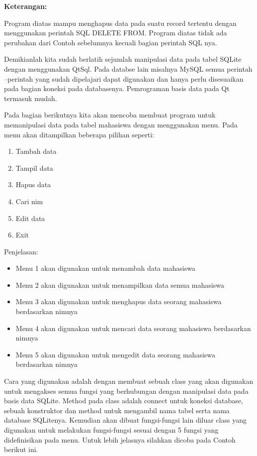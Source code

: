 \textbf{Keterangan:}

Program diatas mampu menghapus data pada suatu record tertentu dengan
menggunakan perintah SQL DELETE FROM. Program diatas tidak ada perubahan
dari Contoh sebelumnya kecuali bagian perintah SQL nya.

Demikianlah kita sudah berlatih sejumlah manipulasi data pada tabel
SQLite dengan menggunakan QtSql. Pada databse lain misalnya MySQL semua
perintah --perintah yang sudah dipelajari dapat digunakan dan hanya
perlu disesuaikan pada bagian koneksi pada databasenya. Pemrograman
basis data pada Qt termasuk mudah.

Pada bagian berikutnya kita akan mencoba membuat program untuk
memanipulasi data pada tabel mahasiswa dengan menggunakan menu. Pada
menu akan ditampilkan beberapa pilihan seperti:

\begin{enumerate}


\item
Tambah data
\item
Tampil data
\item
Hapus data
\item
Cari nim
\item
Edit data
\item
Exit
\end{enumerate}

Penjelasan:

\begin{itemize}

\item
Menu 1 akan digunakan untuk menambah data mahasiswa
\item
Menu 2 akan digunakan untuk menampilkan data semua mahasiswa
\item
Menu 3 akan digunakan untuk menghapus data seorang mahasiswa
berdasarkan nimnya
\item
Menu 4 akan digunakan untuk mencari data seorang mahasiswa berdasarkan
nimnya
\item
Menu 5 akan digunakan untuk mengedit data seorang mahasiswa
berdasarkan nimnya
\end{itemize}

Cara yang digunakan adalah dengan membuat sebuah class yang akan
digunakan untuk mengakses semua fungsi yang berhubungan dengan
manipulasi data pada basis data SQLite. Method pada class adalah connect
untuk koneksi database, sebuah konstruktor dan method untuk mengambil
nama tabel serta nama database SQLitenya. Kemudian akan dibuat
fungsi-fungsi lain diluar class yang digunakan untuk melakukan
fungsi-fungsi sesuai dengan 5 fungsi yang didefinisikan pada menu. Untuk
lebih jelasnya silahkan dicoba pada Contoh berikut ini.

